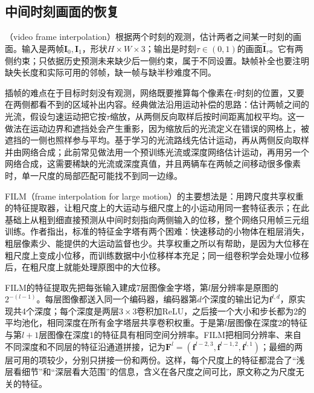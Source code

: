\subsection{中间时刻画面的恢复}
\label{sec:vision-video-interpolation}
\label{sec:vision-video-film}

（video frame interpolation）根据两个时刻的观测，估计两者之间某一时刻的画面。输入是两帧$\bm{I}_0,\bm{I}_1$，形状$H\times W\times3$；输出是时刻$\tau\in(0,1)$的画面$\widehat{\bm{I}}_\tau$。它有两侧约束；只依据历史预测未来缺少后一侧约束，属于不同设置。缺帧补全也要注明缺失长度和实际可用的邻帧，缺一帧与缺半秒难度不同。

插帧的难点在于目标时刻没有观测，网络既要推算每个像素在$\tau$时刻的位置，又要在两侧都看不到的区域补出内容。经典做法沿用运动补偿的思路：估计两帧之间的光流，假设匀速运动把它按$\tau$缩放，从两侧反向取样后按时间距离加权平均。这一做法在运动边界和遮挡处会产生重影，因为缩放后的光流定义在错误的网格上，被遮挡的一侧也照样参与平均。基于学习的光流路线先估计运动，再从两侧反向取样并由网络合成；此前常见做法用一个预训练光流或深度网络估计运动，再用另一个网络合成，这需要稀缺的光流或深度真值，并且两辆车在两帧之间移动很多像素时，单一尺度的局部匹配可能找不到同一边缘。

FILM（frame interpolation for large motion）的主要想法是：用跨尺度共享权重的特征提取器，让粗尺度上的大运动与细尺度上的小运动用同一套特征表示；在此基础上从粗到细直接预测从中间时刻指向两侧输入的位移，整个网络只用帧三元组训练。作者指出，标准的特征金字塔有两个困难：快速移动的小物体在粗层消失，粗层像素少、能提供的大运动监督也少。共享权重之所以有帮助，是因为大位移在粗尺度上变成小位移，而训练数据中小位移样本充足；同一组卷积学会处理小位移后，在粗尺度上就能处理原图中的大位移。

FILM的特征提取先把每张输入建成7层图像金字塔，第$l$层分辨率是原图的$2^{-(l-1)}$。每层图像都送入同一个编码器，编码器第$d$个深度的输出记为$\bm{f}^{l,d}$，原实现共4个深度；每个深度是两层$3\times3$卷积加ReLU，之后接一个大小和步长都为2的平均池化，相同深度在所有金字塔层共享卷积权重。于是第$l$层图像在深度2的特征与第$l+1$层图像在深度1的特征具有相同空间分辨率。FILM把相同分辨率、来自不同深度和不同层的特征沿通道拼接，记为$\bm{F}^{l}=(\bm{f}^{l-2,3},\bm{f}^{l-1,2},\bm{f}^{l,1})$；最细的两层可用的项较少，分别只拼接一份和两份。这样，每个尺度上的特征都混合了“浅层看细节”和“深层看大范围”的信息，含义在各尺度之间可比，原文称之为尺度无关的特征。

